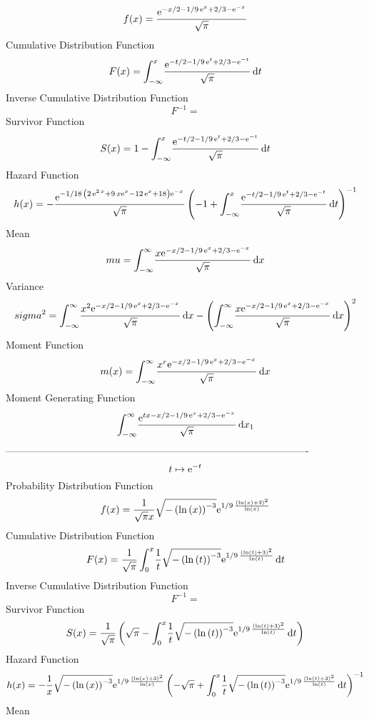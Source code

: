 \documentclass[12pt]{article}
\begin{document}
$$  f(x)={\frac {{{\rm e}^{-x/2-1/9\,{{\rm e}^{x}}+2/3-{{\rm e}^{-x}}}}}{\sqrt 
{\pi}}}
$$Cumulative Distribution Function  
 $$F(x)=\int_{-\infty }^{x}\!{\frac {{{\rm e}^{-t/2-1/9\,{{\rm e}^{t}}+2/3-{
{\rm e}^{-t}}}}}{\sqrt {\pi}}}\,{\rm d}t
$$ Inverse Cumulative Distribution Function 
  $$F^{-1} = $$Survivor Function 
 $$ S(x)=1-\int_{-\infty }^{x}\!{\frac {{{\rm e}^{-t/2-1/9\,{{\rm e}^{t}}+2/3-{
{\rm e}^{-t}}}}}{\sqrt {\pi}}}\,{\rm d}t
$$ Hazard Function 
 $$ h(x)=-{\frac {{{\rm e}^{-1/18\, \left( 2\,{{\rm e}^{2\,x}}+9\,x{{\rm e}^{x}
}-12\,{{\rm e}^{x}}+18 \right) {{\rm e}^{-x}}}}}{\sqrt {\pi}} \left( -
1+\int_{-\infty }^{x}\!{\frac {{{\rm e}^{-t/2-1/9\,{{\rm e}^{t}}+2/3-{
{\rm e}^{-t}}}}}{\sqrt {\pi}}}\,{\rm d}t \right) ^{-1}}
$$Mean 
 $$ mu=\int_{-\infty }^{\infty }\!{\frac {x{{\rm e}^{-x/2-1/9\,{{\rm e}^{x}}+
2/3-{{\rm e}^{-x}}}}}{\sqrt {\pi}}}\,{\rm d}x
$$ Variance 
 $$ sigma^2 = \int_{-\infty }^{\infty }\!{\frac {{x}^{2}{{\rm e}^{-x/2-1/9\,{{\rm e}
^{x}}+2/3-{{\rm e}^{-x}}}}}{\sqrt {\pi}}}\,{\rm d}x- \left( \int_{-
\infty }^{\infty }\!{\frac {x{{\rm e}^{-x/2-1/9\,{{\rm e}^{x}}+2/3-{
{\rm e}^{-x}}}}}{\sqrt {\pi}}}\,{\rm d}x \right) ^{2}
$$Moment Function 
 $$ m(x) = \int_{-\infty }^{\infty }\!{\frac {{x}^{r}{{\rm e}^{-x/2-1/9\,{{\rm e}
^{x}}+2/3-{{\rm e}^{-x}}}}}{\sqrt {\pi}}}\,{\rm d}x
$$ Moment Generating Function 
 $$\int_{-\infty }^{\infty }\!{\frac {{{\rm e}^{tx-x/2-1/9\,{{\rm e}^{x}}
+2/3-{{\rm e}^{-x}}}}}{\sqrt {\pi}}}\,{\rm d}x_{{1}}
$$-------------------------------------------------------------------------------------------  \\$$t\mapsto {{\rm e}^{-t}}
$$Probability Distribution Function 
$$  f(x)={\frac {1}{\sqrt {\pi}x}\sqrt {- \left( \ln  \left( x \right) 
 \right) ^{-3}}{{\rm e}^{1/9\,{\frac { \left( \ln  \left( x \right) +3
 \right) ^{2}}{\ln  \left( x \right) }}}}}
$$Cumulative Distribution Function  
 $$F(x)={\frac {1}{\sqrt {\pi}}\int_{0}^{x}\!{\frac {1}{t}\sqrt {- \left( \ln 
 \left( t \right)  \right) ^{-3}}{{\rm e}^{1/9\,{\frac { \left( \ln 
 \left( t \right) +3 \right) ^{2}}{\ln  \left( t \right) }}}}}
\,{\rm d}t}
$$ Inverse Cumulative Distribution Function 
  $$F^{-1} = $$Survivor Function 
 $$ S(x)={\frac {1}{\sqrt {\pi}} \left( \sqrt {\pi}-\int_{0}^{x}\!{\frac {1}{t}
\sqrt {- \left( \ln  \left( t \right)  \right) ^{-3}}{{\rm e}^{1/9\,{
\frac { \left( \ln  \left( t \right) +3 \right) ^{2}}{\ln  \left( t
 \right) }}}}}\,{\rm d}t \right) }
$$ Hazard Function 
 $$ h(x)=-{\frac {1}{x}\sqrt {- \left( \ln  \left( x \right)  \right) ^{-3}}{
{\rm e}^{1/9\,{\frac { \left( \ln  \left( x \right) +3 \right) ^{2}}{
\ln  \left( x \right) }}}} \left( -\sqrt {\pi}+\int_{0}^{x}\!{\frac {1
}{t}\sqrt {- \left( \ln  \left( t \right)  \right) ^{-3}}{{\rm e}^{1/9
\,{\frac { \left( \ln  \left( t \right) +3 \right) ^{2}}{\ln  \left( t
 \right) }}}}}\,{\rm d}t \right) ^{-1}}
$$Mean 
\end{document}
